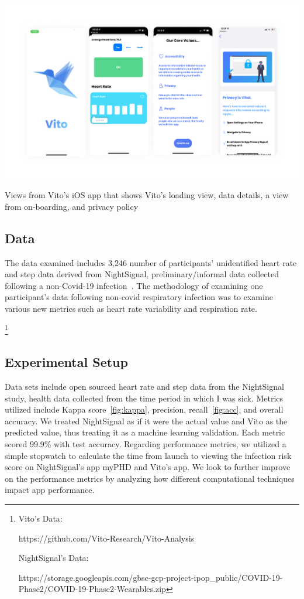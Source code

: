 \documentclass{article}
\newcommand\todo[1]{\textcolor{blue}{#1}}
\begin{document}
\includegraphics[scale=0.08]{VitoApps.png} 

\caption{
Views from Vito's iOS app that shows Vito's loading view, data details, a view from on-boarding, and privacy policy}

\subsection{Data}
The data examined includes 3,246 number of participants' unidentified heart rate and step data derived from NightSignal, preliminary/informal data collected following a non-Covid-19 infection~\cite{VitoAnalysis}.  The methodology of examining one participant's data following non-covid respiratory infection was to examine various new metrics such as heart rate variability and respiration rate.


 \footnote{

Vito's Data: 

https://github.com/Vito-Research/Vito-Analysis

NightSignal's Data:  

https://storage.googleapis.com/gbsc-gcp-project-ipop_public/COVID-19-Phase2/COVID-19-Phase2-Wearables.zip
}

\subsection{Experimental Setup}
Data sets include open sourced heart rate and step data from the NightSignal study, health data collected from the time period in which I was sick.  Metrics utilized include Kappa score~\ref{fig:kappa}, precision, recall~\ref{fig:acc}, and overall accuracy.  We treated NightSignal as if it were the actual value and Vito as the predicted value, thus treating it as a machine learning validation.  Each metric scored 99.9\% with test accuracy.  Regarding performance metrics, we utilized a simple stopwatch to calculate the time from launch to viewing the infection risk score on NightSignal's app myPHD and Vito's app.  We look to further improve on the performance metrics by analyzing how different computational techniques impact app performance. 
\end{document}
